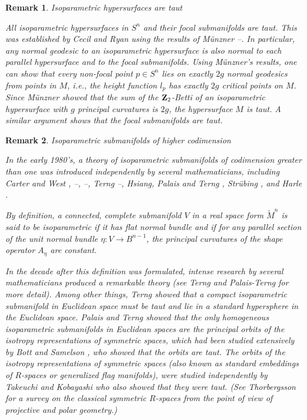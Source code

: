 \documentclass[12pt]{article}
\newtheorem{remark}{Remark}[section]
\begin{document}
{\begin{remark}{Isoparametric hypersurfaces are taut}
\label{rem:isoparametic-hyp-taut}

\noindent
{\rm All isoparametric hypersurfaces in $S^n$ and their focal submanifolds are taut.  This was
established by Cecil and Ryan \cite{CRBer}
using the results of  M\"{u}nzner \cite{Mu}--\cite{Mu2}.
In particular, any normal geodesic to an isoparametric hypersurface
is also normal to each parallel hypersurface and to the focal
submanifolds.  Using  M\"{u}nzner's results, one can show that 
every non-focal point $p \in S^n$ lies on exactly $2g$ normal
geodesics from points in $M$, i.e., the height function
$l_p$ has exactly $2g$ critical points on $M$.  Since
M\"{u}nzner showed that the sum of the ${\bf Z}_2$-Betti
of an isoparametric hypersurface with $g$ principal curvatures
is $2g$, the hypersurface $M$ is taut.  A similar argument shows
that the focal submanifolds are taut.}
\end{remark}


\begin{remark}{Isoparametric submanifolds of higher codimension}
\label{rem:isoparametric-higher-codimension}

\noindent
{\rm In the early 1980's, a theory of isoparametric submanifolds of
codimension greater than one was introduced independently
by several mathematicians, including
Carter and West \cite{CW4}, \cite{CW6}--\cite{CW8}, \cite{West}--\cite{West1}, 
Terng \cite{Te1}--\cite{Te5},  Hsiang, Palais and Terng \cite{HPT}, Str\"{u}bing \cite{Str}, and Harle \cite{Har}.


By definition,
a connected, complete submanifold $V$ in a real space form $\widetilde{M}^n$ is said to be {\em isoparametric} if it has 
flat normal bundle
and if for any parallel section of the unit normal bundle $\eta:V \rightarrow B^{n-1}$, the principal curvatures of
the shape operator $A_\eta$ are constant.

In the decade after this
definition was formulated, intense
research by several mathematicians produced a remarkable
theory (see Terng \cite{Te5} and Palais-Terng
\cite{PalT} for more detail). 
Among other things,
Terng \cite{Te1} showed that a compact isoparametric submanifold
in Euclidean space must be taut and lie in a standard hypersphere in the Euclidean space.
Palais and Terng \cite{PalT1} showed that the only homogeneous
isoparametric submanifolds in Euclidean spaces are the
principal orbits of the isotropy representations of
symmetric spaces, which had been studied extensively by Bott 
and Samelson \cite{BS}, who showed that the orbits are taut.
The orbits of the isotropy 
representations of symmetric spaces (also known as standard embeddings of $R$-spaces or generalized flag manifolds),
were studied independently
by Takeuchi and Kobayashi \cite{TK}  
who also showed that
they were taut.  (See Thorbergsson \cite{Th8} for a survey on the classical symmetric $R$-spaces from
the point of view of projective and polar geometry.)

}
\end{remark}}
\end{document}
